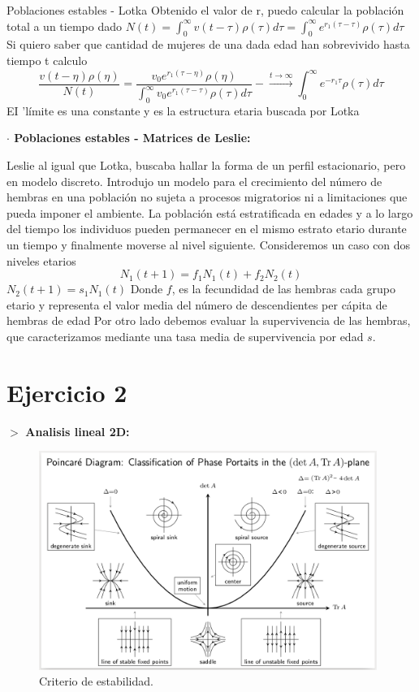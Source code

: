 \documentclass[%
 reprint,
 amsmath,amssymb,
 aps,
]{revtex4-1}
\begin{document}
Poblaciones estables - Lotka
Obtenido el valor de r, puedo calcular la población total a un tiempo dado
$N(t)=\int_{0}^{\infty} v(t-\tau) \rho(\tau) d \tau=\int_{0}^{\infty} e^{r_{1}(\tau-\tau)} \rho(\tau) d \tau$
Si quiero saber que cantidad de mujeres de una dada edad han sobrevivido hasta tiempo t calculo
$$
\frac{v(t-\eta) \rho(\eta)}{N(t)}=\frac{v_{0} e^{r_{1}(\tau-\eta)} \rho(\eta)}{\int_{0}^{\infty} v_{0} e^{r_{1}(\tau-\tau)} \rho(\tau) d \tau}-\stackrel{t \rightarrow \infty}{\rightarrow} \int_{0}^{\infty} e^{-r_{1} \tau} \rho(\tau) d \tau
$$
EI 'límite es una constante y es la estructura etaria buscada por Lotka

\textbf{$\cdot$ Poblaciones estables - Matrices de Leslie:}


Leslie al igual que Lotka, buscaba hallar la forma de un perfil estacionario, pero en modelo discreto. Introdujo un modelo para el crecimiento del número de hembras en una población no sujeta a procesos migratorios ni a limitaciones que pueda imponer el ambiente. La población está estratificada en edades y a lo largo del tiempo los individuos pueden permanecer en el mismo estrato etario durante un tiempo y finalmente moverse al nivel siguiente. Consideremos un caso con dos niveles etarios
$$
N_{1}(t+1)=f_{1} N_{1}(t)+f_{2} N_{2}(t)
$$
$N_{2}(t+1)=s_{1} N_{1}(t)$
Donde $f$, es la fecundidad de las hembras cada grupo etario y representa el valor media del número de descendientes per cápita de hembras de edad Por otro lado debemos evaluar la supervivencia de las hembras, que caracterizamos mediante una tasa media de supervivencia por edad $s$.

\section{Ejercicio 2}

$>$ \textbf{Analisis lineal 2D:}

\begin{figure}[ht!]
  \includegraphics[width = 0.98\textwidth]{Stability_Diagram.png}
  \caption{\label{fig:figura1} Criterio de estabilidad.}
\end{figure} 
\end{document}
